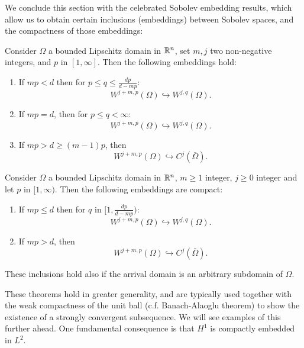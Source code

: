 We conclude this section with the celebrated Sobolev embedding results, which allow us to obtain certain inclusions (embeddings) between Sobolev spaces, and the compactness of those embeddings: 
\begin{theorem}
Consider $\Omega$ a bounded Lipschitz domain in $\mathbb{R}^n$, set $m,j$ two non-negative integers, and $p$ in $[1,\infty]$. Then the following embeddings hold: 
\begin{enumerate}
    \item If $mp < d$ then for $p \leq q \leq \frac{dp}{d-mp}$:
        \begin{equation}
            W^{j+m, p}(\Omega) \hookrightarrow W^{j,q}(\Omega).
        \end{equation}
    \item If $mp = d$, then for $p \leq q < \infty$:
        \begin{equation}
            W^{j+m, p}(\Omega) \hookrightarrow W^{j,q}(\Omega).
        \end{equation}
    \item If $mp > d \geq (m-1)p$, then 
        \begin{equation}
            W^{j+m,p}(\Omega) \hookrightarrow C^j(\bar\Omega).
        \end{equation}
    \end{enumerate}
\end{theorem}

\begin{theorem}
Consider $\Omega$ a bounded Lipschitz domain in $\mathbb{R}^n$, $m\geq 1$ integer, $j\geq 0$ integer and let $p$ in $[1,\infty)$. Then the following embeddings are compact:
\begin{enumerate}
    \item If $mp \leq d$  then for $q$ in $[1, \frac{dp}{d - mp})$:
        \begin{equation}
            W^{j+m, p}(\Omega) \hookrightarrow W^{j,q}(\Omega).
        \end{equation}
    \item If $mp > d$, then 
        \begin{equation}
            W^{j+m, p}(\Omega) \hookrightarrow C^j(\bar\Omega).
        \end{equation}
\end{enumerate}
These inclusions hold also if the arrival domain is an arbitrary subdomain of $\Omega$. 
\end{theorem}
These theorems hold in greater generality, and are typically used together with the weak compactness of the unit ball (c.f. Banach-Alaoglu theorem) to show the existence of a strongly convergent subsequence. We will see examples of this further ahead. One fundamental consequence is that $H^1$ is compactly embedded in $L^2$.

